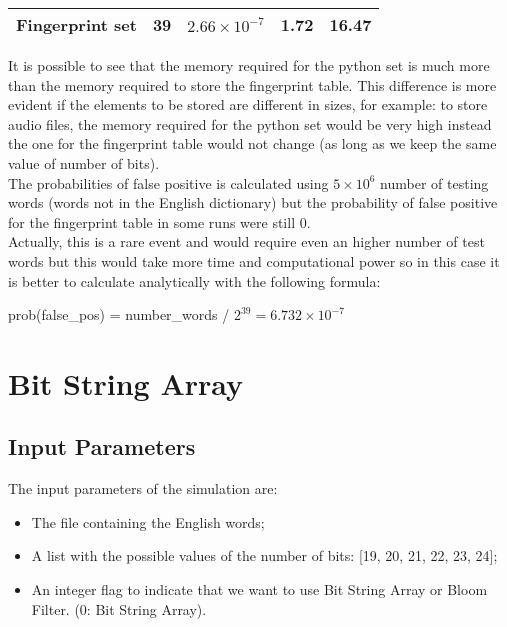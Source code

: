 \documentclass[twocolumn,letterpaper]{report}
\begin{document}
{\begin{table}[h!]
{\begin{tabular}{|l|c|c|c|c|}
						\textbf{Fingerprint set} &
						  39 &
						  $2.66 \times 10^{- 7}$ &
						  1.72 &
						  16.47 \\ \hline
						\end{tabular}
						}
				\end{table}
				It is possible to see that  the memory required for the python set is much more than the memory required to store the fingerprint table. This difference is more evident if the elements to be stored are different in sizes, for example: to store audio files, the memory required for the python set would be very high instead the one for the fingerprint table would not change (as long as we keep the same value of number of bits). \\
				The probabilities of false positive is calculated using $ 5 \times 10^{6}$ number of testing words (words not in the English dictionary) but the probability of false positive for the fingerprint table in some runs were still 0. \\
				Actually, this is a rare event and would require even an higher number of test words but this would take more time and computational power so in this case it is better to calculate analytically with the following formula:
				\begin{center}
					prob(false\_pos) = number\_words / $2^{39} =  6.732 \times 10^{-7}$
			\end{center}
				
					
			
			\section{Bit String Array}	 
	 
				\subsection{Input Parameters}
					The input parameters of the simulation are:
					\begin{itemize}
						\item The file containing the English words;
						\item A list with the possible values of the number of bits: [19, 20, 21, 22, 23, 24];
						\item An integer flag to indicate that we want to use Bit String Array or Bloom Filter. (0: Bit String Array).
					\end{itemize}
					 
}
\end{document}
